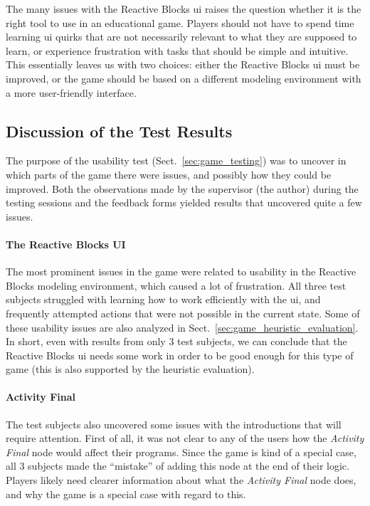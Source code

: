 \noindent
The many issues with the Reactive Blocks \gls{ui} raises the question whether it is the right tool to use in an educational game. Players should not have to spend time learning \gls{ui} quirks that are not necessarily relevant to what they are supposed to learn, or experience frustration with tasks that should be simple and intuitive. This essentially leaves us with two choices: either the Reactive Blocks \gls{ui} must be improved, or the game should be based on a different modeling environment with a more user-friendly interface.

\subsection{Discussion of the Test Results}
\label{sec:game_test_discussion}
The purpose of the usability test (Sect.~\ref{sec:game_testing}) was to uncover in which parts of the game there were issues, and possibly how they could be improved. Both the observations made by the supervisor (the author) during the testing sessions and the feedback forms yielded results that uncovered quite a few issues.

\paragraph{The Reactive Blocks UI} The most prominent issues in the game were related to usability in the Reactive Blocks modeling environment, which caused a lot of frustration. All three test subjects struggled with learning how to work efficiently with the \gls{ui}, and frequently attempted actions that were not possible in the current state. Some of these usability issues are also analyzed in Sect.~\ref{sec:game_heuristic_evaluation}. In short, even with results from only 3 test subjects, we can conclude that the Reactive Blocks \gls{ui} needs some work in order to be good enough for this type of game (this is also supported by the heuristic evaluation).

\paragraph{Activity Final} The test subjects also uncovered some issues with the introductions that will require attention. First of all, it was not clear to any of the users how the \emph{Activity Final} node would affect their programs. Since the game is kind of a special case, all 3 subjects made the ``mistake'' of adding this node at the end of their logic. Players likely need clearer information about what the \emph{Activity Final} node does, and why the game is a special case with regard to this.

